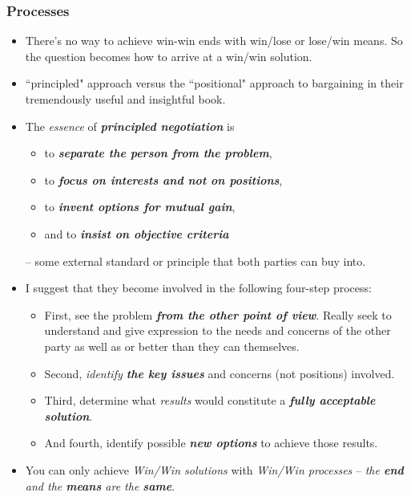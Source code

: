 \documentclass[11pt]{article}
\begin{document}
\subsubsection{Processes}
\begin{itemize}
\item There's no way to achieve win-win ends with win/lose or lose/win means. So the question becomes how to arrive at a win/win solution.

\item ``principled" approach versus the ``positional" approach to bargaining in their tremendously useful and insightful book.

\item The \emph{essence} of \emph{\textbf{principled negotiation}} is
\begin{itemize}
\item to \emph{\textbf{separate the person from the problem}},
\item to \emph{\textbf{focus on interests and not on positions}}, 
\item to \emph{\textbf{invent options for mutual gain}}, 
\item and to \emph{\textbf{insist on objective criteria}}
\end{itemize}
 --  some external standard or principle that both parties can buy into.
 
 \item I suggest that they become involved in the following four-step process:
 \begin{itemize}
 \item First, see the problem \emph{\textbf{from the other point of view}}. Really seek to understand and give expression to the needs and concerns of the other party as well as or better than they can themselves. 
 \item Second, \emph{identify \textbf{the key issues}} and concerns (not positions) involved. 
 \item Third, determine what \emph{results} would constitute a \emph{\textbf{fully acceptable solution}}.
 \item And fourth, identify possible \emph{\textbf{new options}} to achieve those results.
 \end{itemize}
 
 \item You can only achieve \emph{Win/Win solutions} with \emph{Win/Win processes} -- \emph{the \textbf{end} and the \textbf{means} are the \textbf{same}}.
\end{itemize}
\end{document}
